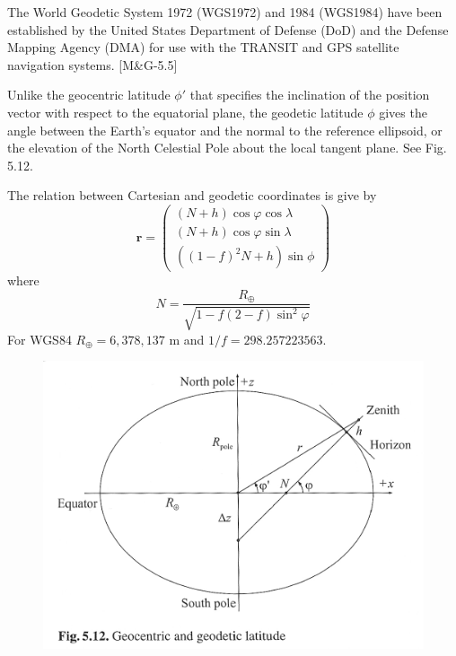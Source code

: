\documentclass[11pt]{article}
\begin{document}
The World Geodetic System 1972 (WGS1972) and 1984 (WGS1984)
have been established by the United States Department of Defense (DoD)
and the Defense Mapping Agency (DMA) for use with the TRANSIT and GPS
satellite navigation systems. [M\&G-5.5]

Unlike the geocentric latitude $\phi'$ that specifies the inclination
of the position vector with respect to the equatorial plane, the
geodetic latitude $\phi$ gives the angle between the Earth's equator
and the normal to the reference ellipsoid, or the elevation of the
North Celestial Pole about the local tangent plane. See Fig. 5.12.

The relation between Cartesian and geodetic coordinates is give by
\begin{equation}
  \boldsymbol{r} = \left(\begin{array}{c}
    (N + h)\cos\varphi\cos\lambda \\
    (N + h)\cos\varphi\sin\lambda \\
    ((1 - f)^2N + h)\sin\phi
  \end{array}\right) \label{5.83}\tag{5.83}
\end{equation}
where
\begin{equation}
  N = \frac{R_{\oplus}}{\sqrt{1 - f(2 - f)\sin^2\varphi}} \label{5.84}\tag{5.84}
\end{equation}
For WGS84 $R_{\oplus} = 6,378,137$ m and $1/f = 298.257223563$.

\begin{figure}
  \begin{center}
    \includegraphics{figure-5-12.pdf}
  \end{center}
\end{figure}
\end{document}
